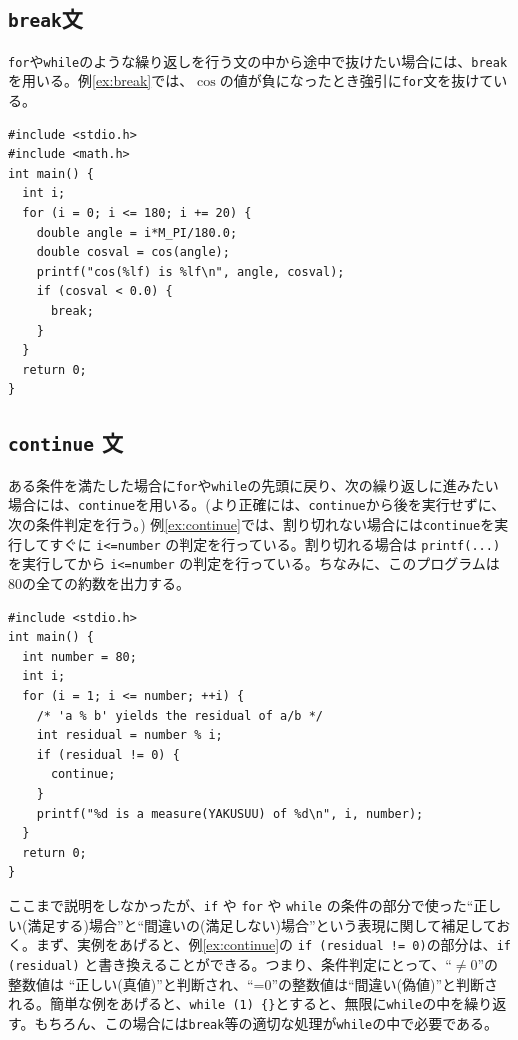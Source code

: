 \subsection{{\tt break}文}
{\tt for}や{\tt while}のような繰り返しを行う文の中から途中で抜けたい場合には、\verb|break|を用いる。例\ref{ex:break}では、$\cos$の値が負になったとき強引に\verb|for|文を抜けている。
%
\begin{reidai}\label{ex:break}
\begin{verbatim}
#include <stdio.h>
#include <math.h>
int main() {
  int i;
  for (i = 0; i <= 180; i += 20) {
    double angle = i*M_PI/180.0;
    double cosval = cos(angle);
    printf("cos(%lf) is %lf\n", angle, cosval);
    if (cosval < 0.0) {
      break;
    }
  }
  return 0;
}
\end{verbatim}
\end{reidai}
%

\subsection{{\tt continue} 文}
ある条件を満たした場合に\verb|for|や\verb|while|の先頭に戻り、次の繰り返しに進みたい場合には、\verb|continue|を用いる。(より正確には、\verb|continue|から後を実行せずに、次の条件判定を行う。) 例\ref{ex:continue}では、割り切れない場合には\verb|continue|を実行してすぐに \verb|i<=number| の判定を行っている。割り切れる場合は \verb|printf(...)| を実行してから \verb|i<=number| の判定を行っている。ちなみに、このプログラムは80の全ての約数を出力する。
%
\begin{reidai}\label{ex:continue}
\begin{verbatim}
#include <stdio.h>
int main() {
  int number = 80;
  int i;
  for (i = 1; i <= number; ++i) {
    /* 'a % b' yields the residual of a/b */
    int residual = number % i;
    if (residual != 0) {
      continue;
    }
    printf("%d is a measure(YAKUSUU) of %d\n", i, number);
  }
  return 0;
}
\end{verbatim}
\end{reidai}

ここまで説明をしなかったが、\verb|if| や \verb|for| や \verb|while| の条件の部分で使った``正しい(満足する)場合''と``間違いの(満足しない)場合''という表現に関して補足しておく。まず、実例をあげると、例\ref{ex:continue}の \verb|if (residual != 0)|の部分は、\verb|if (residual)| と書き換えることができる。つまり、条件判定にとって、``$\neq$0''の整数値は ``正しい(真値)''と判断され、``=0''の整数値は``間違い(偽値)''と判断される。簡単な例をあげると、\verb|while (1) {}|とすると、無限に\verb|while|の中を繰り返す。もちろん、この場合には{\tt break}等の適切な処理が\verb|while|の中で必要である。

